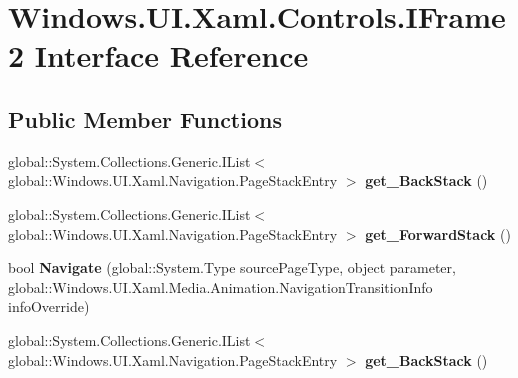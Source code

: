 \hypertarget{interface_windows_1_1_u_i_1_1_xaml_1_1_controls_1_1_i_frame2}{}\section{Windows.\+U\+I.\+Xaml.\+Controls.\+I\+Frame2 Interface Reference}
\label{interface_windows_1_1_u_i_1_1_xaml_1_1_controls_1_1_i_frame2}
\subsection*{Public Member Functions}
\begin{DoxyCompactItemize}
\item 
\mbox{\label{interface_windows_1_1_u_i_1_1_xaml_1_1_controls_1_1_i_frame2_ade8b031cab9ada8cf6038a885fabfe5c}} 
global\+::\+System.\+Collections.\+Generic.\+I\+List$<$ global\+::\+Windows.\+U\+I.\+Xaml.\+Navigation.\+Page\+Stack\+Entry $>$ {\bfseries get\+\_\+\+Back\+Stack} ()
\item 
\mbox{\label{interface_windows_1_1_u_i_1_1_xaml_1_1_controls_1_1_i_frame2_a49daee7f2dba9da8ec0551c2b9170002}} 
global\+::\+System.\+Collections.\+Generic.\+I\+List$<$ global\+::\+Windows.\+U\+I.\+Xaml.\+Navigation.\+Page\+Stack\+Entry $>$ {\bfseries get\+\_\+\+Forward\+Stack} ()
\item 
\mbox{\label{interface_windows_1_1_u_i_1_1_xaml_1_1_controls_1_1_i_frame2_a32261d4af33cf5fe60bbf99cf9aaad33}} 
bool {\bfseries Navigate} (global\+::\+System.\+Type source\+Page\+Type, object parameter, global\+::\+Windows.\+U\+I.\+Xaml.\+Media.\+Animation.\+Navigation\+Transition\+Info info\+Override)
\item 
\mbox{\label{interface_windows_1_1_u_i_1_1_xaml_1_1_controls_1_1_i_frame2_ade8b031cab9ada8cf6038a885fabfe5c}} 
global\+::\+System.\+Collections.\+Generic.\+I\+List$<$ global\+::\+Windows.\+U\+I.\+Xaml.\+Navigation.\+Page\+Stack\+Entry $>$ {\bfseries get\+\_\+\+Back\+Stack} ()
\item 
\mbox{\label{interface_windows_1_1_u_i_1_1_xaml_1_1_controls_1_1_i_frame2_a49daee7f2dba9da8ec0551c2b9170002}} 

\end{DoxyCompactItemize}
